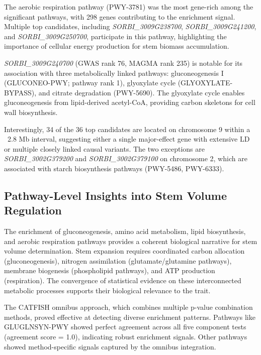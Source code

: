\documentclass[11pt]{article}
\begin{document}
The aerobic respiration pathway (PWY-3781) was the most gene-rich among the significant pathways, with 298 genes contributing to the enrichment signal. Multiple top candidates, including \textit{SORBI\_3009G238700}, \textit{SORBI\_3009G241200}, and \textit{SORBI\_3009G250700}, participate in this pathway, highlighting the importance of cellular energy production for stem biomass accumulation.

\textit{SORBI\_3009G240700} (GWAS rank 76, MAGMA rank 235) is notable for its association with three metabolically linked pathways: gluconeogenesis I (GLUCONEO-PWY; pathway rank 1), glyoxylate cycle (GLYOXYLATE-BYPASS), and citrate degradation (PWY-5690). The glyoxylate cycle enables gluconeogenesis from lipid-derived acetyl-CoA, providing carbon skeletons for cell wall biosynthesis.

Interestingly, 34 of the 36 top candidates are located on chromosome 9 within a ~2.8 Mb interval, suggesting either a single major-effect gene with extensive LD or multiple closely linked causal variants. The two exceptions are \textit{SORBI\_3002G379200} and \textit{SORBI\_3002G379100} on chromosome 2, which are associated with starch biosynthesis pathways (PWY-5486, PWY-6333).

\subsection{Pathway-Level Insights into Stem Volume Regulation}

The enrichment of gluconeogenesis, amino acid metabolism, lipid biosynthesis, and aerobic respiration pathways provides a coherent biological narrative for stem volume determination. Stem expansion requires coordinated carbon allocation (gluconeogenesis), nitrogen assimilation (glutamate/glutamine pathways), membrane biogenesis (phospholipid pathways), and ATP production (respiration). The convergence of statistical evidence on these interconnected metabolic processes supports their biological relevance to the trait.

The CATFISH omnibus approach, which combines multiple p-value combination methods, proved effective at detecting diverse enrichment patterns. Pathways like GLUGLNSYN-PWY showed perfect agreement across all five component tests (agreement score = 1.0), indicating robust enrichment signals. Other pathways showed method-specific signals captured by the omnibus integration.

\end{document}
